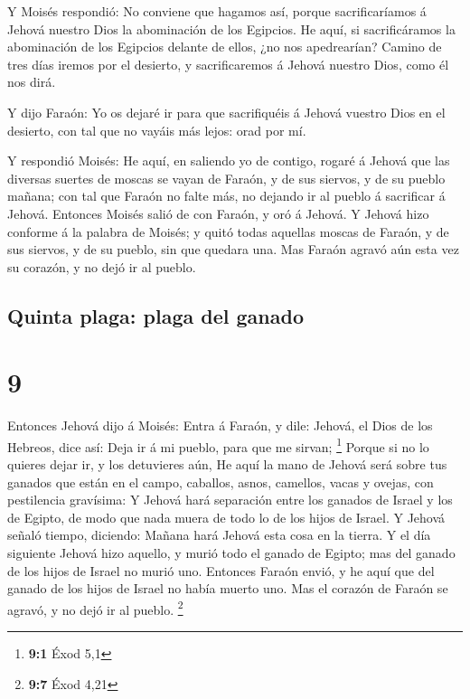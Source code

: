  Y Moisés respondió: No conviene que hagamos así, porque
sacrificaríamos á Jehová nuestro Dios la abominación de los Egipcios. He
aquí, si sacrificáramos la abominación de los Egipcios delante de ellos,
¿no nos apedrearían?  Camino de tres días iremos por el
desierto, y sacrificaremos á Jehová nuestro Dios, como él nos dirá.

 Y dijo Faraón: Yo os dejaré ir para que sacrifiquéis á
Jehová vuestro Dios en el desierto, con tal que no vayáis más lejos:
orad por mí.

 Y respondió Moisés: He aquí, en saliendo yo de contigo,
rogaré á Jehová que las diversas suertes de moscas se vayan de Faraón, y
de sus siervos, y de su pueblo mañana; con tal que Faraón no falte más,
no dejando ir al pueblo á sacrificar á Jehová.  Entonces
Moisés salió de con Faraón, y oró á Jehová.  Y Jehová hizo
conforme á la palabra de Moisés; y quitó todas aquellas moscas de
Faraón, y de sus siervos, y de su pueblo, sin que quedara una.
 Mas Faraón agravó aún esta vez su corazón, y no dejó ir al
pueblo.

\hypertarget{quinta-plaga-plaga-del-ganado}{%
\subsection{Quinta plaga: plaga del
ganado}\label{quinta-plaga-plaga-del-ganado}}

\hypertarget{section-8}{%
\section{9}\label{section-8}}

 Entonces Jehová dijo á Moisés: Entra á Faraón, y dile:
Jehová, el Dios de los Hebreos, dice así: Deja ir á mi pueblo, para que
me sirvan; \footnote{\textbf{9:1} Éxod 5,1}  Porque si no lo
quieres dejar ir, y los detuvieres aún,  He aquí la mano de
Jehová será sobre tus ganados que están en el campo, caballos, asnos,
camellos, vacas y ovejas, con pestilencia gravísima:  Y
Jehová hará separación entre los ganados de Israel y los de Egipto, de
modo que nada muera de todo lo de los hijos de Israel.  Y
Jehová señaló tiempo, diciendo: Mañana hará Jehová esta cosa en la
tierra.  Y el día siguiente Jehová hizo aquello, y murió
todo el ganado de Egipto; mas del ganado de los hijos de Israel no murió
uno.  Entonces Faraón envió, y he aquí que del ganado de los
hijos de Israel no había muerto uno. Mas el corazón de Faraón se agravó,
y no dejó ir al pueblo. \footnote{\textbf{9:7} Éxod 4,21}

